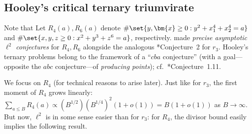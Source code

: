 \documentclass[12pt]{report}
\begin{document}
\subsection{Hooley's critical ternary triumvirate}


Note that
Let $R_4(a),R_6(a)$ denote
$\#\set{y,\bm{x}\geq0: y^2+x_1^4+x_2^4=a}$
and $\#\set{x,y,z\geq0: x^2+y^3+z^6=a}$,
respectively.
\cite{hooley1986some} made \emph{precise asymptotic $\ell^2$ conjectures} for $R_4,R_6$
alongside the analogous \cite{hooley1986some}*{Conjecture~2} for $r_3$.
Hooley's ternary problems belong to the framework of
a ``$cba$ conjecture''
(with a goal---opposite the $abc$ conjecture---of \emph{producing points});
cf.~\cite{harpaz2017geometry}*{Conjecture~1.11}.

We focus on $R_4$
(for technical reasons to arise later).
Just like for $r_3$,
the first moment of $R_4$ grows linearly:
$\sum_{a\leq B}R_4(a)
\propto (B^{1/2})(B^{1/4})^2(1+o(1)) = B(1+o(1))$
as $B\to\infty$.
But now,
$\ell^2$ is in some sense easier than for $r_3$:
for $R_4$,
the divisor bound easily implies the following result.


\end{document}
